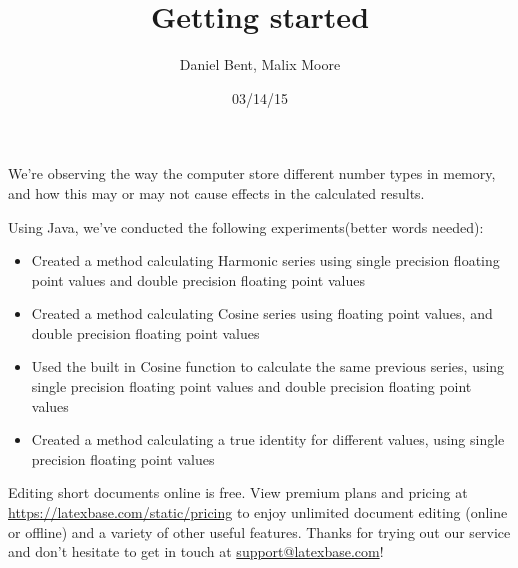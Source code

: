 \documentclass[12pt]{article}
\title{Getting started}
\author{Daniel Bent, Malix Moore}
\date{03/14/15}
\begin{document}
\maketitle

We’re observing the way the computer store different number types in memory, and how this may or may not cause effects in the calculated results.

Using Java, we’ve conducted the following experiments(better words needed):

\begin{itemize}
  \item Created a method calculating Harmonic series using single precision floating point values and double precision floating point values
  \item Created a method calculating Cosine series using floating point values, and double precision floating point values
  \item Used the built in Cosine function to calculate the same previous series, using single precision floating point values and double precision floating point values
  \item Created a method calculating a true identity for different values, using single precision floating point values
\end{itemize}

Editing short documents online is free. View premium plans and pricing at
\url{https://latexbase.com/static/pricing} to enjoy unlimited document editing
(online or offline) and a variety of other useful features. Thanks for trying
out our service and don't hesitate to get in touch at
\href{mailto:support@latexbase.com}{support@latexbase.com}!
\end{document}
